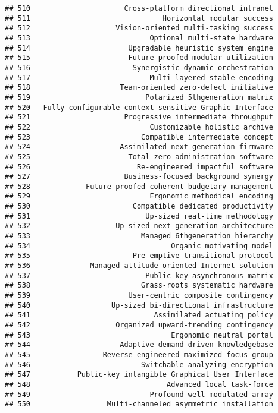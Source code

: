 \documentclass[
]{article}
\begin{document}
\begin{verbatim}
## 510                      Cross-platform directional intranet
## 511                               Horizontal modular success
## 512                    Vision-oriented multi-tasking success
## 513                            Optional multi-state hardware
## 514                       Upgradable heuristic system engine
## 515                       Future-proofed modular utilization
## 516                        Synergistic dynamic orchestration
## 517                            Multi-layered stable encoding
## 518                     Team-oriented zero-defect initiative
## 519                           Polarized 5thgeneration matrix
## 520   Fully-configurable context-sensitive Graphic Interface
## 521                      Progressive intermediate throughput
## 522                            Customizable holistic archive
## 523                          Compatible intermediate concept
## 524                     Assimilated next generation firmware
## 525                       Total zero administration software
## 526                         Re-engineered impactful software
## 527                      Business-focused background synergy
## 528             Future-proofed coherent budgetary management
## 529                            Ergonomic methodical encoding
## 530                        Compatible dedicated productivity
## 531                           Up-sized real-time methodology
## 532                    Up-sized next generation architecture
## 533                          Managed 6thgeneration hierarchy
## 534                                 Organic motivating model
## 535                        Pre-emptive transitional protocol
## 536              Managed attitude-oriented Internet solution
## 537                           Public-key asynchronous matrix
## 538                          Grass-roots systematic hardware
## 539                       User-centric composite contingency
## 540                   Up-sized bi-directional infrastructure
## 541                             Assimilated actuating policy
## 542                    Organized upward-trending contingency
## 543                                 Ergonomic neutral portal
## 544                     Adaptive demand-driven knowledgebase
## 545                 Reverse-engineered maximized focus group
## 546                          Switchable analyzing encryption
## 547           Public-key intangible Graphical User Interface
## 548                                Advanced local task-force
## 549                            Profound well-modulated array
## 550                  Multi-channeled asymmetric installation

\end{verbatim}
\end{document}
